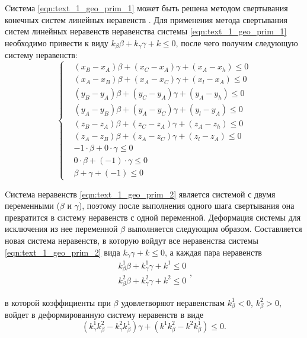 Cистема \eqref{eqn:text_1_geo_prim_1} может быть решена методом свертывания конечных систем линейных неравенств \cite{Chernikov1963}.
Для применения метода свертывания систем линейных неравенств неравенства системы \eqref{eqn:text_1_geo_prim_1} необходимо привести к виду $k_{\beta}\beta + k_{\gamma}\gamma + k \le 0$, после чего получим следующую систему неравенств:
\begin{equation}\label{eqn:text_1_geo_prim_2}
	\left\{
		\begin{aligned}
			& (x_B - x_A) \beta + (x_C - x_A) \gamma + (x_A - x_h) \le 0 \\
			& (x_A - x_B) \beta + (x_A - x_C) \gamma + (x_l - x_A) \le 0 \\
			& (y_B - y_A) \beta + (y_C - y_A) \gamma + (y_A - y_h) \le 0 \\
			& (y_A - y_B) \beta + (y_A - y_C) \gamma + (y_l - y_A) \le 0 \\
			& (z_B - z_A) \beta + (z_C - z_A) \gamma + (z_A - z_h) \le 0 \\
			& (z_A - z_B) \beta + (z_A - z_C) \gamma + (z_l - z_A) \le 0 \\
			& -1 \cdot \beta + 0 \cdot \gamma \le 0 \\
			& 0 \cdot \beta + (-1) \cdot \gamma \le 0 \\
			& \beta + \gamma + (-1) \le 0
		\end{aligned}
	\right.
\end{equation}

Cистема неравенств \eqref{eqn:text_1_geo_prim_2} является системой с двумя переменными ($\beta$ и $\gamma$), поэтому после выполнения одного шага свертывания она превратится в систему неравенств с одной переменной.
Деформация системы для исключения из нее переменной $\beta$ выполняется следующим образом.
Составляется новая система неравенств, в которую войдут все неравенства системы \eqref{eqn:text_1_geo_prim_2} вида $k_{\gamma} \gamma + k \le 0$, а каждая пара неравенств
\begin{equation}
	\begin{aligned}
		k_{\beta}^1 \beta + k_{\gamma}^1 \gamma + k^1 \le 0 \\
		k_{\beta}^2 \beta + k_{\gamma}^2 \gamma + k^2 \le 0
	\end{aligned},
\end{equation}

в которой коэффициенты при $\beta$ удовлетворяют неравенствам $k_{\beta}^1 < 0$, $k_{\beta}^2 > 0$, войдет в деформированную систему неравенств в виде
\begin{equation}
	(k_{\gamma}^1 k_{\beta}^2 - k_{\gamma}^2 k_{\beta}^1) \gamma + (k^1 k_{\beta}^2 - k^2 k_{\beta}^1) \le 0. 
\end{equation}

